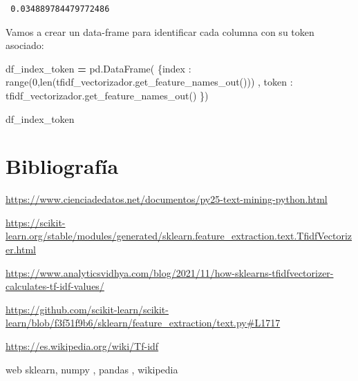 \documentclass[
  11pt,
  a4paper,
]{article}
\newenvironment{Shaded}{\begin{snugshade}}{\end{snugshade}}
\newcommand{\BuiltInTok}[1]{#1}
\newcommand{\DecValTok}[1]{\textcolor[rgb]{0.00,0.00,0.81}{#1}}
\newcommand{\NormalTok}[1]{#1}
\newcommand{\OperatorTok}[1]{\textcolor[rgb]{0.81,0.36,0.00}{\textbf{#1}}}
\newcommand{\StringTok}[1]{\textcolor[rgb]{0.31,0.60,0.02}{#1}}
\begin{document}
\begin{verbatim}
 0.034889784479772486
\end{verbatim}

Vamos a crear un data-frame para identificar cada columna con su token
asociado:

\begin{Shaded}
\begin{Highlighting}[]
\NormalTok{df\_index\_token }\OperatorTok{=}\NormalTok{ pd.DataFrame( \{}\StringTok{\textquotesingle{}index\textquotesingle{}}\NormalTok{ : }\BuiltInTok{range}\NormalTok{(}\DecValTok{0}\NormalTok{,}\BuiltInTok{len}\NormalTok{(tfidf\_vectorizador.get\_feature\_names\_out())) , }\StringTok{\textquotesingle{}token\textquotesingle{}}\NormalTok{ : tfidf\_vectorizador.get\_feature\_names\_out() \})}

\NormalTok{df\_index\_token}
\end{Highlighting}
\end{Shaded}

\hypertarget{bibliografuxeda}{%
\section{Bibliografía}\label{bibliografuxeda}}

\url{https://www.cienciadedatos.net/documentos/py25-text-mining-python.html}

\url{https://scikit-learn.org/stable/modules/generated/sklearn.feature_extraction.text.TfidfVectorizer.html}

\url{https://www.analyticsvidhya.com/blog/2021/11/how-sklearns-tfidfvectorizer-calculates-tf-idf-values/}

\url{https://github.com/scikit-learn/scikit-learn/blob/f3f51f9b6/sklearn/feature_extraction/text.py\#L1717}

\url{https://es.wikipedia.org/wiki/Tf-idf}

web sklearn, numpy , pandas , wikipedia
\end{document}
